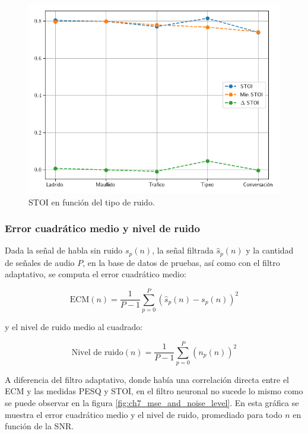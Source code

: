 \begin{figure}
	\centering
	\centerline{\includegraphics[scale=0.75]{images/ch7/dnn_metric_STOI_noises.png}}
	\caption{STOI en función del tipo de ruido.}
	\label{fig:ch7_stoi_resume_by_noise}
\end{figure} 

\subsubsection{Error cuadrático medio y nivel de ruido}

Dada la señal de habla sin ruido $s_p(n)$, la señal filtrada $\hat{s}_p(n)$ y la cantidad de señales de audio $P$, en la base de datos de pruebas, así como con el filtro adaptativo, se computa el error cuadrático medio:

\begin{equation*}
	\text{ECM}(n) = \frac{1}{P-1} \sum_{p=0}^{P} (\hat{s}_p(n) - s_p(n))^2
\end{equation*}

\noindent y el nivel de ruido medio al cuadrado:

\begin{equation*}
	\text{Nivel de ruido}(n) = \frac{1}{P-1} \sum_{p=0}^{P} (n_p(n))^2
\end{equation*}

A diferencia del filtro adaptativo, donde había una correlación directa entre el ECM y las medidas PESQ y STOI, en el filtro neuronal no sucede lo mismo como se puede observar en la figura \ref{fig:ch7_mse_and_noise_level}. En esta gráfica se muestra el error cuadrático medio y el nivel de ruido, promediado para todo $n$ en función de la SNR. 

